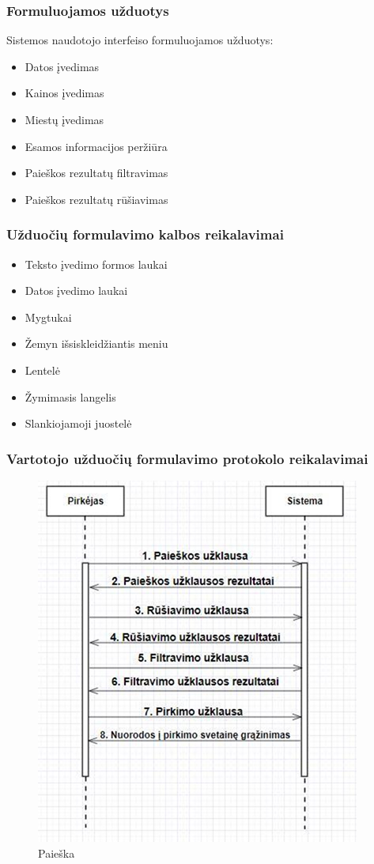 \documentclass{VUMIFPSkursinis}
\begin{document}
\subsubsection{Formuluojamos užduotys}
Sistemos naudotojo interfeiso formuluojamos užduotys:
\begin{itemize}
  \item Datos įvedimas
  \item Kainos įvedimas
  \item Miestų įvedimas
  \item Esamos informacijos peržiūra
  \item Paieškos rezultatų filtravimas
  \item Paieškos rezultatų rūšiavimas
\end{itemize}

\subsubsection{Užduočių formulavimo kalbos reikalavimai}
\begin{itemize}
  \item Teksto įvedimo formos laukai
  \item Datos įvedimo laukai
  \item Mygtukai
  \item Žemyn išsiskleidžiantis meniu
  \item Lentelė
  \item Žymimasis langelis
  \item Slankiojamoji juostelė
\end{itemize}

\subsubsection{Vartotojo užduočių formulavimo protokolo reikalavimai}
\begin{figure}[H]
  \centering
  \includegraphics[scale=1]{img/paieska1}
  \caption{Paieška}
  \label{paieska}
\end{figure}
\end{document}

